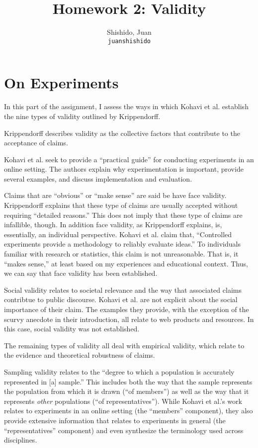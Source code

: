 \documentclass[11pt]{article}
\title{Homework 2: Validity}
\author{
  Shishido, Juan\\
  \texttt{juanshishido}
}
\begin{document}
\maketitle

\section{On Experiments}

In this part of the assignment, I assess the ways in which Kohavi et al.
establish the nine types of validity outlined by Krippendorff.

Krippendorff describes validity as the collective factors that contribute to
the acceptance of claims.

Kohavi et al. seek to provide a ``practical guide'' for conducting experiments
in an online setting. The authors explain why experimentation is important,
provide several examples, and discuss implementation and evaluation.

Claims that are ``obvious'' or ``make sense'' are said be have face validity.
Krippendorff explains that these type of claims are usually accepted without
requiring ``detailed reasons.'' This does not imply that these type of claims
are infallible, though. In addition face validity, as Krippendorff explains,
is, essentially, an individual perspective. Kohavi et al. claim that,
``Controlled experiments provide a methodology to reliably evaluate ideas.'' To
individuals familiar with research or statistics, this claim is not
unreasonable. That is, it ``makes sense,'' at least based on my experiences and
educational context. Thus, we can say that face validity has been established.

Social validity relates to societal relevance and the way that associated
claims contribtue to public discourse. Kohavi et al. are not explicit about
the social importance of their claim. The examples they provide, with the
exception of the scurvy anecdote in their introduction, all relate to web
products and resources. In this case, social validity was not established.

The remaining types of validity all deal with empirical validity, which relate
to the evidence and theoretical robustness of claims.

Sampling validity relates to the ``degree to which a population is accurately
represented in [a] sample.'' This includes both the way that the sample
represents the population from which it is drawn (``of members'') as well as
the way that it represents \emph{other} populations (``of representatives'').
While Kohavi et al.'s work relates to experiments in an online setting (the
``members'' component), they also provide extensive information that relates to
experiments in general (the ``representatives'' component) and even synthesize
the terminology used across disciplines.
\end{document}
